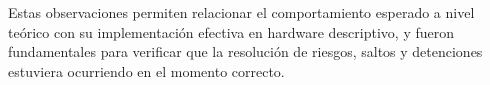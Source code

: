 Estas observaciones permiten relacionar el comportamiento esperado a nivel teórico con su implementación efectiva en hardware descriptivo, y fueron fundamentales para verificar que la resolución de riesgos, saltos y detenciones estuviera ocurriendo en el momento correcto.

